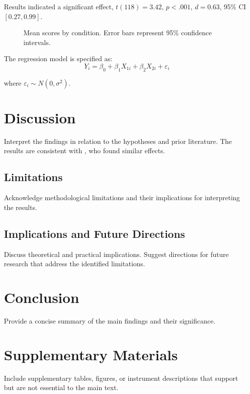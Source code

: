 \documentclass[man]{apa7}
\begin{document}
Results indicated a significant effect, $t(118) = 3.42$,
$p < .001$, $d = 0.63$, 95\% CI $[0.27, 0.99]$.

\begin{figure}[ht]
  \centering
  \caption{Mean scores by condition. Error bars represent 95\%
  confidence intervals.}
  \label{fig:results}
\end{figure}

The regression model is specified as:
\begin{equation}
  Y_i = \beta_0 + \beta_1 X_{1i} + \beta_2 X_{2i} + \varepsilon_i
  \label{eq:regression}
\end{equation}

where $\varepsilon_i \sim N(0, \sigma^2)$.

\section{Discussion}

Interpret the findings in relation to the hypotheses and prior
literature. The results are consistent with \textcite{smith2023},
who found similar effects.

\subsection{Limitations}

Acknowledge methodological limitations and their implications
for interpreting the results.

\subsection{Implications and Future Directions}

Discuss theoretical and practical implications. Suggest directions
for future research that address the identified limitations.

\section{Conclusion}

Provide a concise summary of the main findings and their
significance.

\printbibliography

\appendix

\section{Supplementary Materials}

Include supplementary tables, figures, or instrument descriptions
that support but are not essential to the main text.
\end{document}
